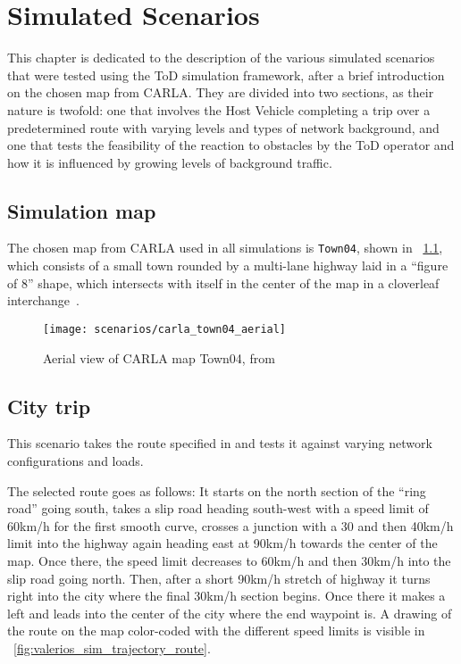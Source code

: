 \chapter{Simulated Scenarios}
\label{chap:simulated_scenarios}
This chapter is dedicated to the description of the various simulated scenarios that were tested using the ToD simulation framework, after a brief introduction on the chosen map from CARLA.
They are divided into two sections, as their nature is twofold: one that involves the Host Vehicle completing a trip over a predetermined route with varying levels and types of network background, and one that tests the feasibility of the reaction to obstacles by the ToD operator and how it is influenced by growing levels of background traffic.

\section{Simulation map}
The chosen map from CARLA used in all simulations is \texttt{Town04}, shown in \figurename~\ref{fig:carla_town04_aerial}, which consists of a small town rounded by a multi-lane highway laid in a ``figure of 8'' shape, which intersects with itself in the center of the map in a cloverleaf interchange~\cite{carladoc}.

\begin{figure}[h]
    \centering
    \texttt{[image: scenarios/carla\_town04\_aerial]}
    \caption{Aerial view of CARLA map Town04, from \cite{carladoc}}
    \label{fig:carla_town04_aerial}
\end{figure}

\section{City trip}
This scenario takes the route specified in \cite{valeriopaper} and tests it against varying network configurations and loads.

The selected route goes as follows: It starts on the north section of the ``ring road'' going south, takes a slip road heading south-west with a speed limit of 60km/h for the first smooth curve, crosses a junction with a 30 and then 40km/h limit into the highway again heading east at 90km/h towards the center of the map. Once there, the speed limit decreases to 60km/h and then 30km/h into the slip road going north. Then, after a short 90km/h stretch of highway it turns right into the city where the final 30km/h section begins. Once there it makes a left and leads into the center of the city where the end waypoint is. A drawing of the route on the map color-coded with the different speed limits is visible in \figurename~\ref{fig:valerios_sim_trajectory_route}.

